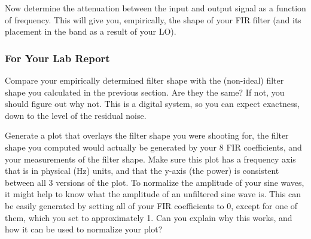 \documentclass[11pt]{article}
\begin{document}
Now determine the attenuation between the input and output signal as a function of frequency.  This will
give you, empirically, the shape of your FIR filter (and its placement in the band as a result of your LO).

\subsubsection{For Your Lab Report}

Compare your empirically determined filter shape with the (non-ideal) filter shape you calculated in the previous section.
Are they the same?  If not, you should figure out why not.  This is a digital system, so you can expect exactness, down to the
level of the residual noise.

Generate a plot that overlays the filter shape you were shooting for, the filter shape you computed would actually
be generated by your 8 FIR coefficients, and your measurements of the filter shape.  Make sure this plot has
a frequency axis that is in physical (Hz) units, and that the y-axis (the power) is consistent between all 3 versions
of the plot.  To normalize the amplitude of your sine waves, it might help to know what the amplitude of
an unfiltered sine wave is.  This can be easily generated by setting all of your FIR coefficients to 0, except
for one of them, which you set to approximately 1.  Can you explain why this works, and how it can be used
to normalize your plot?
\end{document}
